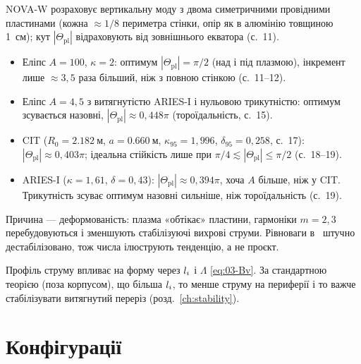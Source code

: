 \begin{corpusexample}
NOVA-W розраховує вертикальну моду з двома симетричними провідними пластинами (кожна $\approx1/8$ периметра стінки, опір як в алюмінію товщиною \SI{1}{см}); кут $|\Theta_{\mathrm{pl}}|$ відраховують від зовнішнього екватора (с.~11).
\begin{itemize}
\item Еліпс $A=100$, $\kappa=2$: оптимум $|\Theta_{\mathrm{pl}}|=\pi/2$ (над і під плазмою), інкремент лише $\approx3{,}5$ раза більший, ніж з повною стінкою (с.~11--12).
\item Еліпс $A=4{,}5$ з витягнутістю ARIES-I і нульовою трикутністю: оптимум зсувається назовні, $|\Theta_{\mathrm{pl}}|\approx0{,}448\pi$ (тороїдальність, с.~15).
\item CIT ($R_0=\SI{2.182}{м}$, $a=\SI{0.660}{м}$, $\kappa_{95}=1{,}996$, $\delta_{95}=0{,}258$, с.~17): $|\Theta_{\mathrm{pl}}|\approx0{,}403\pi$; ідеальна стійкість лише при $\pi/4\lesssim|\Theta_{\mathrm{pl}}|\le\pi/2$ (с.~18--19).
\item ARIES-I ($\kappa=1{,}61$, $\delta=0{,}43$): $|\Theta_{\mathrm{pl}}|\approx0{,}394\pi$, хоча $A$ більше, ніж у CIT. Трикутність зсуває оптимум назовні сильніше, ніж тороїдальність (с.~19).
\end{itemize}
Причина --- деформованість: плазма «обтікає» пластини, гармоніки $m=2,3$ перебудовуються і зменшують стабілізуючі вихрові струми. Рівноваги в~\cite{Ward1992} штучно дестабілізовано, тож числа ілюструють тенденцію, а не проєкт.
\end{corpusexample}

Профіль струму впливає на форму через $l_{i}$ і $\Lambda$ \eqref{eq:03-Bv}. За стандартною теорією (поза корпусом), що більша $l_{i}$, то менше струму на периферії і то важче стабілізувати витягнутий переріз (розд.~\ref{ch:stability}).

\section{Конфігурації}\label{sec:04-configs}

